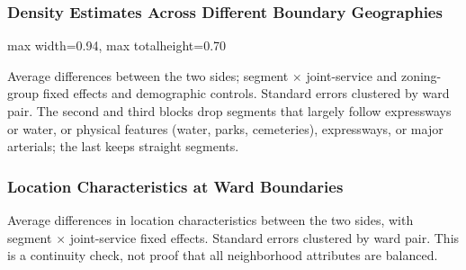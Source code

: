 \begin{frame}[label=density-geometry]
    \frametitle{Density Estimates Across Different Boundary Geographies}
    \centering
    \begin{adjustbox}{max width=0.94\textwidth, max totalheight=0.70\textheight}\end{adjustbox}
    \par\medskip
    \scriptsize Average differences between the two sides; segment $\times$ joint-service and zoning-group fixed effects and demographic controls. Standard errors clustered by ward pair. The second and third blocks drop segments that largely follow expressways or water, or physical features (water, parks, cemeteries), expressways, or major arterials; the last keeps straight segments.
    \vfill\hfill\hyperlink{visual-rd-main}{}
\end{frame}

\begin{frame}[label=density-location]
    \frametitle{Location Characteristics at Ward Boundaries}
    \centering\small
    
    \par\medskip
    \footnotesize Average differences in location characteristics between the two sides, with segment $\times$ joint-service fixed effects. Standard errors clustered by ward pair. This is a continuity check, not proof that all neighborhood attributes are balanced.
    \vfill\hfill\hyperlink{identification-strategy}{}
\end{frame}

